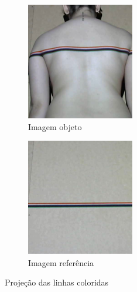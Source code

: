 \documentclass[a4paper, 12pt]{article}
\begin{document}
\begin{figure}[h!]
	\centering
    \begin{subfigure}{.35\textwidth}
      \centering
      \includegraphics[width=.85\linewidth]{imagem_projecao_colorida_a.png} 
      \caption{Imagem objeto}
      \label{imagem_projecao_colorida:a}
    \end{subfigure}
    \begin{subfigure}{.35\textwidth}
      \centering
      \includegraphics[width=.85\linewidth]{imagem_projecao_colorida_b.png} 
      \caption{Imagem referência}
      \label{imagem_projecao_colorida:b}
    \end{subfigure}
	\caption{Projeção das linhas coloridas}
	\label{imagem_projecao_colorida}
\end{figure}
\end{document}
